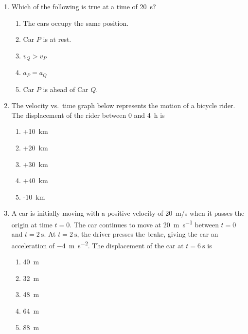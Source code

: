 \documentclass{../../../oss-apphys}
\begin{document}
\begin{multicols}{2}
\begin{enumerate}[resume,leftmargin=18pt]
  \item Which of the following is true at a time of \SI{20}{\second}?
    \begin{enumerate}[noitemsep,topsep=0pt,leftmargin=18pt,label=(\Alph*)]
    \item The cars occupy the same position.
    \item Car $P$ is at rest.
    \item $v_Q>v_P$
    \item $a_P=a_Q$
    \item Car $P$ is ahead of Car $Q$.
    \end{enumerate}
    \label{q:graph2}
    
  \item The velocity vs.\ time graph below represents the motion of a bicycle
    rider. The displacement of the rider between $0$ and \SI{4}{\hour} is
    \begin{center}
    \end{center}
    \begin{enumerate}[noitemsep,topsep=0pt,leftmargin=18pt,label=(\Alph*)]
    \item +\SI{10}{\kilo\metre}
    \item +\SI{20}{\kilo\metre}
    \item +\SI{30}{\kilo\metre}
    \item +\SI{40}{\kilo\metre}
    \item -\SI{10}{\kilo\metre}
    \end{enumerate}
    \columnbreak
    
  \item A car is initially moving with a positive velocity of \SI{20}{m/s} when
    it passes the origin at time $t=0$. The car continues to move at
    \SI{20}{\metre\per\second} between $t=0$ and $t=\SI{2}{\second}$. At
    $t=\SI{2}{\second}$, the driver presses the brake, giving the car an
    acceleration of \SI{-4}{\metre\per\second^2}. The displacement of the car
    at $t=\SI{6}{\second}$ is
    \begin{enumerate}[noitemsep,topsep=0pt,leftmargin=18pt,label=(\Alph*)]
    \item\SI{40}{\metre}
    \item\SI{32}{\metre}
    \item\SI{48}{\metre}
    \item\SI{64}{\metre}
    \item\SI{88}{\metre}
    \end{enumerate}
    

\end{enumerate}
\end{multicols}
\end{document}

